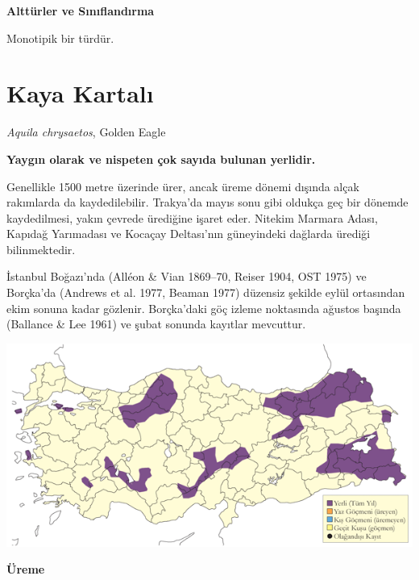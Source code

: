 \documentclass[
  letterpaper,
  DIV=11,
  numbers=noendperiod]{scrreprt}
\begin{document}
\textbf{Alttürler ve Sınıflandırma}

Monotipik bir türdür.

\section{Kaya Kartalı}\label{kaya-kartalux131}

\emph{Aquila chrysaetos}, Golden Eagle

\textbf{Yaygın olarak ve nispeten çok sayıda bulunan yerlidir.}

Genellikle 1500 metre üzerinde ürer, ancak üreme dönemi dışında alçak
rakımlarda da kaydedilebilir. Trakya'da mayıs sonu gibi oldukça geç bir
dönemde kaydedilmesi, yakın çevrede ürediğine işaret eder. Nitekim
Marmara Adası, Kapıdağ Yarımadası ve Kocaçay Deltası'nın güneyindeki
dağlarda ürediği bilinmektedir.

İstanbul Boğazı'nda (Alléon \& Vian 1869--70, Reiser 1904, OST 1975) ve
Borçka'da (Andrews et al. 1977, Beaman 1977) düzensiz şekilde eylül
ortasından ekim sonuna kadar gözlenir. Borçka'daki göç izleme noktasında
ağustos başında (Ballance \& Lee 1961) ve şubat sonunda kayıtlar
mevcuttur.

\includegraphics{images/harita_Page_096.png}

\textbf{Üreme}
\end{document}
